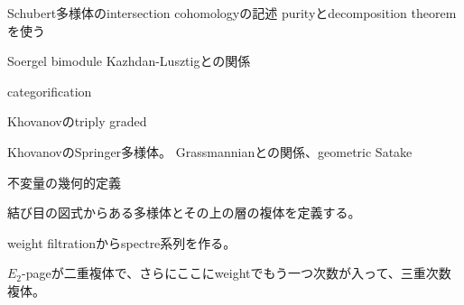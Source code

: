 \documentclass[dvipdfmx]{beamer}
\begin{document}
\begin{frame}{Schubert多様体のintersection cohomologyの記述}
purityとdecomposition theoremを使う
\end{frame}

\begin{frame}{Soergel bimodule}
Kazhdan-Lusztigとの関係

categorification

Khovanovのtriply graded
\end{frame}

\begin{frame}
KhovanovのSpringer多様体。
Grassmannianとの関係、geometric Satake
\end{frame}

\begin{frame}
不変量の幾何的定義

結び目の図式からある多様体とその上の層の複体を定義する。

weight filtrationからspectre系列を作る。

$E_2$-pageが二重複体で、さらにここにweightでもう一つ次数が入って、三重次数複体。
\end{frame}
\end{document}
